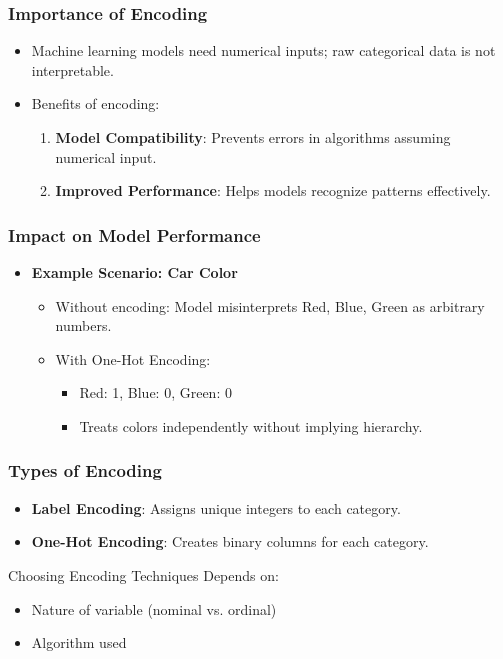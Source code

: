 \documentclass[aspectratio=169]{beamer}
\begin{document}
\begin{frame}
    \frametitle{Importance of Encoding}
    \begin{itemize}
        \item Machine learning models need numerical inputs; raw categorical data is not interpretable.
        \item Benefits of encoding:
        \begin{enumerate}
            \item \textbf{Model Compatibility}: Prevents errors in algorithms assuming numerical input.
            \item \textbf{Improved Performance}: Helps models recognize patterns effectively.
        \end{enumerate}
    \end{itemize}
\end{frame}

\begin{frame}
    \frametitle{Impact on Model Performance}
    \begin{itemize}
        \item \textbf{Example Scenario: Car Color} 
        \begin{itemize}
            \item Without encoding: Model misinterprets Red, Blue, Green as arbitrary numbers.
            \item With One-Hot Encoding: 
            \begin{itemize}
                \item Red: 1, Blue: 0, Green: 0
                \item Treats colors independently without implying hierarchy.
            \end{itemize}
        \end{itemize}
    \end{itemize}
\end{frame}

\begin{frame}
    \frametitle{Types of Encoding}
    \begin{itemize}
        \item \textbf{Label Encoding}: Assigns unique integers to each category.
        \item \textbf{One-Hot Encoding}: Creates binary columns for each category.
    \end{itemize}
    \begin{block}{Choosing Encoding Techniques}
        Depends on:
        \begin{itemize}
            \item Nature of variable (nominal vs. ordinal)
            \item Algorithm used
        \end{itemize}
    \end{block}
\end{frame}
\end{document}

